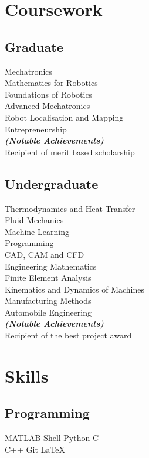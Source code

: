 \documentclass[]{deedy-resume-openfont}
\begin{document}
\begin{minipage}[t]{0.33\textwidth}
\section{Coursework}
\subsection{Graduate}
Mechatronics \\
Mathematics for Robotics \\
Foundations of Robotics \\
Advanced Mechatronics \\
Robot Localisation and Mapping \\
Entrepreneurship \\
{\footnotesize \textit{\textbf{(Notable Achievements) }}} \\
Recipient of merit based scholarship \\
\sectionsep

\subsection{Undergraduate}
Thermodynamics and Heat Transfer \\
Fluid Mechanics \\
Machine Learning \\
Programming \\
CAD, CAM and CFD \\
Engineering Mathematics\\
Finite Element Analysis\\
Kinematics and Dynamics of Machines\\
Manufacturing Methods\\
Automobile Engineering\\
{\footnotesize \textit{\textbf{(Notable Achievements) }}} \\
Recipient of the best project award \\


\section{Skills}
\subsection{Programming}
MATLAB \textbullet{}   Shell \textbullet{} Python \textbullet{} C \\
C++ \textbullet{} Git\textbullet{} \LaTeX\ \\ 

\end{minipage}
\end{document}
